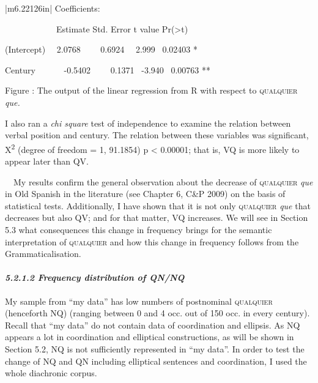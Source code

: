 \begin{flushleft}
\tablefirsthead{}
\tablehead{}
\tabletail{}
\tablelasttail{}
\begin{supertabular}{|m{6.22126in}|}
\hline
Coefficients:

\ \ \ \ \ \ \ \ \ \ \ \ Estimate Std. Error t value Pr({\textgreater}{\textbar}t{\textbar}) \ \ 

(Intercept) \ \ 2.0768 \ \ \ \ 0.6924 \ \ 2.999 \ 0.02403 * 

Century \ \ \ \ \ \ {}-0.5402 \ \ \ \ 0.1371 \ {}-3.940 \ 0.00763 **\\\hline
\end{supertabular}
\end{flushleft}
\begin{styleStandard}
Figure : The output of the linear regression from R with respect to \textsc{qualquier} \textit{que.}
\end{styleStandard}

\begin{styleStandard}
I also ran a\textit{ chi square} test of independence to examine the relation between verbal position and century. The relation between these variables was significant, X\textsuperscript{2} (degree of freedom = 1, 91.1854) p {\textless} 0.00001; that is, VQ is more likely to appear later than QV.
\end{styleStandard}

\begin{styleStandard}
\ \ My results confirm the general observation about the decrease of \textsc{qualquier}\textit{ que} in Old Spanish in the literature (see Chapter 6, C\&P 2009) on the basis of statistical tests. Additionally, I have shown that it is not only \textsc{qualquier}\textit{ que} that decreases but also QV; and for that matter, VQ increases. We will see in Section 5.3 what consequences this change in frequency brings for the semantic interpretation of \textsc{qualquier} and how this change in frequency follows from the Grammaticalisation.
\end{styleStandard}

\paragraph[5.2.1.2 Frequency distribution of QN/NQ]{\textit{5.2.1.2 Frequency distribution of QN/NQ}}
\begin{styleStandard}
My sample from “my data” has low numbers of postnominal \textsc{qualquier} (henceforth NQ) (ranging between 0 and 4 occ. out of 150 occ. in every century). Recall that “my data” do not contain data of coordination and ellipsis. As NQ appears a lot in coordination and elliptical constructions, as will be shown in Section 5.2, NQ is not sufficiently represented in “my data”. In order to test the change of NQ and QN including elliptical sentences and coordination, I used the whole diachronic corpus.
\end{styleStandard}

